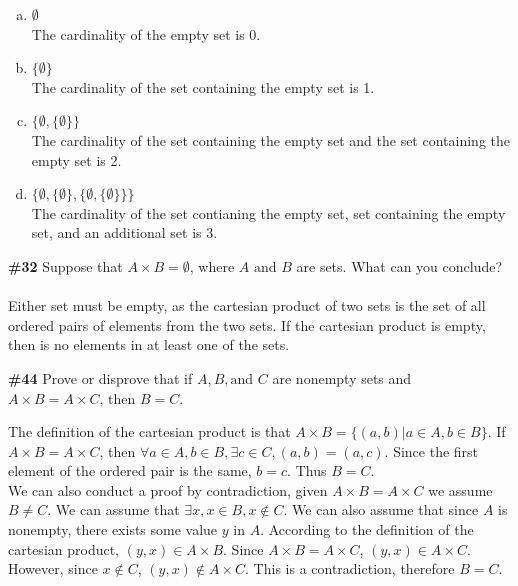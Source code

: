 \documentclass{article}
\newcommand{\problem}[1]{\textbf{\##1}}
\newcommand{\prob}[1]{\problem{#1}}
\begin{document}
\begin{enumerate}[a)]
    \item \(\emptyset\)\\
    The cardinality of the empty set is 0.
    \item \(\{\emptyset\}\)\\
    The cardinality of the set containing the empty set is 1.
    \item \(\{\emptyset, \{\emptyset\}\}\)\\
    The cardinality of the set containing the empty set and the set containing the empty set is 2.
    \item \(\{\emptyset, \{\emptyset\}, \{\emptyset, \{\emptyset\}\}\}\)\\
    The cardinality of the set contianing the empty set, set containing the empty set, and an additional set is 3.
\end{enumerate}

\pagebreak
\prob{32} Suppose that \(A \times B = \emptyset\), where \(A \text{ and } B\) are sets. What can you conclude?\\\\
Either set must be empty, as the cartesian product of two sets is the set of all ordered pairs of elements from the two sets. If the cartesian product is empty, then is no elements in at least one of the sets.

\pagebreak
\prob{44} Prove or disprove that if \(A, B, \text{and } C\) are nonempty sets and \(A \times B = A \times C\text{, then } B = C\).

The definition of the cartesian product is that \(A \times B = \{(a,b) | a \in A, b \in B\}\). If \(A \times B = A \times C\), then \(\forall a \in A, b \in B, \exists c \in C, (a,b) = (a,c)\). Since the first element of the ordered pair is the same, \(b = c\). Thus \(B = C\).\\

We can also conduct a proof by contradiction, given \(A \times B = A \times C\) we assume \(B \neq C\). We can assume that \(\exists x, x \in B, x \notin C\). We can also assume that since \(A\) is nonempty, there exists some value \(y\) in \(A\). According to the definition of the cartesian product, \((y,x) \in A \times B\). Since \(A \times B = A \times C\), \((y,x) \in A \times C\). However, since \(x \notin C\), \((y,x) \notin A \times C\). This is a contradiction, therefore \(B = C\).
\end{document}
